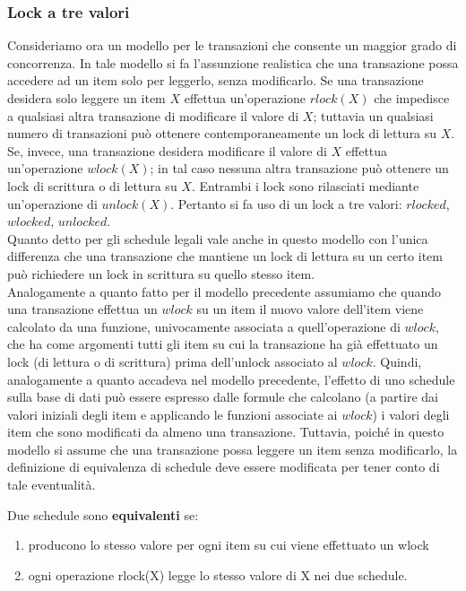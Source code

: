 \subsubsection{Lock a tre valori}
Consideriamo ora un modello per le transazioni che consente un maggior grado di concorrenza. In
tale modello si fa l’assunzione realistica che una transazione possa accedere ad un item solo per
leggerlo, senza modificarlo. Se una transazione desidera solo leggere un item $X$ effettua
un’operazione $rlock(X)$ che impedisce a qualsiasi altra transazione di modificare il valore di $X$;
tuttavia un qualsiasi numero di transazioni può ottenere contemporaneamente un lock di lettura su
$X$. Se, invece, una transazione desidera modificare il valore di $X$ effettua un’operazione $wlock(X)$; in
tal caso nessuna altra transazione può ottenere un lock di scrittura o di lettura su $X$. Entrambi i lock
sono rilasciati mediante un’operazione di $unlock(X)$. Pertanto si fa uso di un lock a tre valori:
$rlocked$, $wlocked$, $unlocked$.\\
Quanto detto per gli schedule legali vale anche in questo modello con l’unica differenza che una
transazione che mantiene un lock di lettura su un certo item può richiedere un lock in scrittura su
quello stesso item.\\
Analogamente a quanto fatto per il modello precedente assumiamo che quando una transazione
effettua un $wlock$ su un item il nuovo valore dell’item viene calcolato da una funzione,
univocamente associata a quell’operazione di $wlock$, che ha come argomenti tutti gli item su cui la
transazione ha già effettuato un lock (di lettura o di scrittura) prima dell’unlock associato al $wlock$.
Quindi, analogamente a quanto accadeva nel modello precedente, l’effetto di uno schedule sulla
base di dati può essere espresso dalle formule che calcolano (a partire dai valori iniziali degli item e
applicando le funzioni associate ai $wlock$) i valori degli item che sono modificati da almeno una
transazione. Tuttavia, poiché in questo modello si assume che una transazione possa leggere un item
senza modificarlo, la definizione di equivalenza di schedule deve essere modificata per tener conto
di tale eventualità.\\
\begin{defn}
 Due schedule sono \textbf{equivalenti} se:
 \begin{enumerate}
  \item producono lo stesso valore per ogni item su cui viene effettuato un wlock
  \item ogni operazione rlock(X) legge lo stesso valore di X nei due schedule.
 \end{enumerate}
\end{defn}


